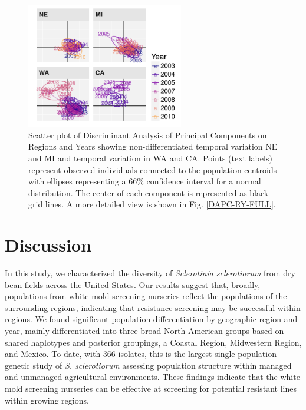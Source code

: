 \documentclass[fleqn,10pt,lineno]{wlpeerj} %
\theoremstyle{definition}
\theoremstyle{definition}
\theoremstyle{definition}
\theoremstyle{remark}
\begin{document}
\begin{figure}
\centering
\includegraphics[width=0.61000\textwidth]{../../results/figures/publication/dapc_region_year_micanewa.pdf}
\caption{Scatter plot of Discriminant Analysis of Principal Components
on Regions and Years showing non-differentiated temporal variation NE
and MI and temporal variation in WA and CA. Points (text labels)
represent observed individuals connected to the population centroids
with ellipses representing a 66\% confidence interval for a normal
distribution. The center of each component is represented as black grid
lines. A more detailed view is shown in Fig.
\ref{DAPC-RY-FULL}.}\label{DAPC-RY}
\end{figure}

\section*{Discussion}\label{discussion}

In this study, we characterized the diversity of \emph{Sclerotinia
sclerotiorum} from dry bean fields across the United States. Our results
suggest that, broadly, populations from white mold screening nurseries
reflect the populations of the surrounding regions, indicating that
resistance screening may be successful within regions. We found
significant population differentiation by geographic region and year,
mainly differentiated into three broad North American groups based on
shared haplotypes and posterior groupings, a Coastal Region, Midwestern
Region, and Mexico. To date, with 366 isolates, this is the largest
single population genetic study of \emph{S. sclerotiorum} assessing
population structure within managed and unmanaged agricultural
environments. These findings indicate that the white mold screening
nurseries can be effective at screening for potential resistant lines
within growing regions.
\end{document}
